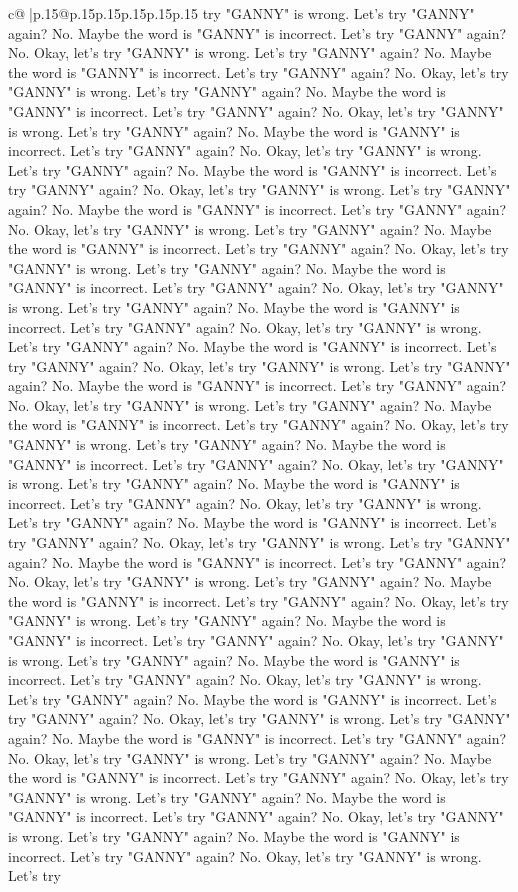 \documentclass{article}
\begin{document}
{\begin{supertabular}{c@{$\;$}|p{.15\linewidth}@{}p{.15\linewidth}p{.15\linewidth}p{.15\linewidth}p{.15\linewidth}p{.15\linewidth}}
{{{try "GANNY" is wrong. Let's try "GANNY" again? No. Maybe the word is "GANNY" is incorrect. Let's try "GANNY" again? No. Okay, let's try "GANNY" is wrong. Let's try "GANNY" again? No. Maybe the word is "GANNY" is incorrect. Let's try "GANNY" again? No. Okay, let's try "GANNY" is wrong. Let's try "GANNY" again? No. Maybe the word is "GANNY" is incorrect. Let's try "GANNY" again? No. Okay, let's try "GANNY" is wrong. Let's try "GANNY" again? No. Maybe the word is "GANNY" is incorrect. Let's try "GANNY" again? No. Okay, let's try "GANNY" is wrong. Let's try "GANNY" again? No. Maybe the word is "GANNY" is incorrect. Let's try "GANNY" again? No. Okay, let's try "GANNY" is wrong. Let's try "GANNY" again? No. Maybe the word is "GANNY" is incorrect. Let's try "GANNY" again? No. Okay, let's try "GANNY" is wrong. Let's try "GANNY" again? No. Maybe the word is "GANNY" is incorrect. Let's try "GANNY" again? No. Okay, let's try "GANNY" is wrong. Let's try "GANNY" again? No. Maybe the word is "GANNY" is incorrect. Let's try "GANNY" again? No. Okay, let's try "GANNY" is wrong. Let's try "GANNY" again? No. Maybe the word is "GANNY" is incorrect. Let's try "GANNY" again? No. Okay, let's try "GANNY" is wrong. Let's try "GANNY" again? No. Maybe the word is "GANNY" is incorrect. Let's try "GANNY" again? No. Okay, let's try "GANNY" is wrong. Let's try "GANNY" again? No. Maybe the word is "GANNY" is incorrect. Let's try "GANNY" again? No. Okay, let's try "GANNY" is wrong. Let's try "GANNY" again? No. Maybe the word is "GANNY" is incorrect. Let's try "GANNY" again? No. Okay, let's try "GANNY" is wrong. Let's try "GANNY" again? No. Maybe the word is "GANNY" is incorrect. Let's try "GANNY" again? No. Okay, let's try "GANNY" is wrong. Let's try "GANNY" again? No. Maybe the word is "GANNY" is incorrect. Let's try "GANNY" again? No. Okay, let's try "GANNY" is wrong. Let's try "GANNY" again? No. Maybe the word is "GANNY" is incorrect. Let's try "GANNY" again? No. Okay, let's try "GANNY" is wrong. Let's try "GANNY" again? No. Maybe the word is "GANNY" is incorrect. Let's try "GANNY" again? No. Okay, let's try "GANNY" is wrong. Let's try "GANNY" again? No. Maybe the word is "GANNY" is incorrect. Let's try "GANNY" again? No. Okay, let's try "GANNY" is wrong. Let's try "GANNY" again? No. Maybe the word is "GANNY" is incorrect. Let's try "GANNY" again? No. Okay, let's try "GANNY" is wrong. Let's try "GANNY" again? No. Maybe the word is "GANNY" is incorrect. Let's try "GANNY" again? No. Okay, let's try "GANNY" is wrong. Let's try "GANNY" again? No. Maybe the word is "GANNY" is incorrect. Let's try "GANNY" again? No. Okay, let's try "GANNY" is wrong. Let's try "GANNY" again? No. Maybe the word is "GANNY" is incorrect. Let's try "GANNY" again? No. Okay, let's try "GANNY" is wrong. Let's try "GANNY" again? No. Maybe the word is "GANNY" is incorrect. Let's try "GANNY" again? No. Okay, let's try "GANNY" is wrong. Let's try "GANNY" again? No. Maybe the word is "GANNY" is incorrect. Let's try "GANNY" again? No. Okay, let's try "GANNY" is wrong. Let's try "GANNY" again? No. Maybe the word is "GANNY" is incorrect. Let's try "GANNY" again? No. Okay, let's try "GANNY" is wrong. Let's try }}}
\end{supertabular}}
\end{document}
